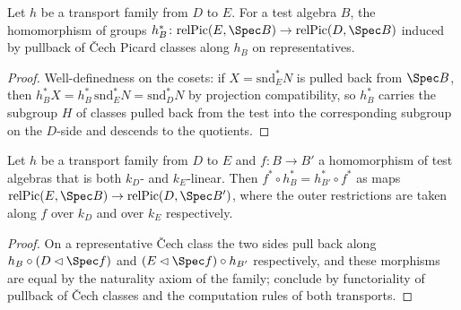 \begin{definition}
  \label{pa-def:relPicTransport}
  \leanok

  Let \(h\) be a transport family from \(D\) to \(E\). For a test algebra \(B\), the
  homomorphism of groups
  \(h_B^{*} \colon \mathrm{relPic}(E, \Spec B) \to \mathrm{relPic}(D, \Spec B)\) induced by
  pullback of \v Cech Picard classes along \(h_B\) on representatives.
\end{definition}
\begin{proof}
  \leanok
  Well-definedness on the cosets: if \(X = \mathrm{snd}_E^{*} N\) is pulled back from
  \(\Spec B\), then \(h_B^{*} X = h_B^{*}\, \mathrm{snd}_E^{*} N = \mathrm{snd}_D^{*} N\)
  by projection compatibility, so \(h_B^{*}\) carries the subgroup \(H\) of classes pulled
  back from the test into the corresponding subgroup on the \(D\)-side and descends to the
  quotients.
\end{proof}

\begin{lemma}
  \label{pa-lem:relPicTransport_naturality}
  \leanok

  Let \(h\) be a transport family from \(D\) to \(E\) and \(f \colon B \to B'\) a
  homomorphism of test algebras that is both \(k_D\)- and \(k_E\)-linear. Then
  \(f^{*} \circ h_B^{*} = h_{B'}^{*} \circ f^{*}\) as maps
  \(\mathrm{relPic}(E, \Spec B) \to \mathrm{relPic}(D, \Spec B')\), where the outer
  restrictions are taken along \(f\) over \(k_D\) and over \(k_E\) respectively.
\end{lemma}
\begin{proof}
  \leanok
  On a representative \v Cech class the two sides pull back along
  \(h_B \circ (D \lhd \Spec f)\) and \((E \lhd \Spec f) \circ h_{B'}\) respectively, and
  these morphisms are equal by the naturality axiom of the family; conclude by
  functoriality of pullback of \v Cech classes and the computation rules of both
  transports.
\end{proof}

